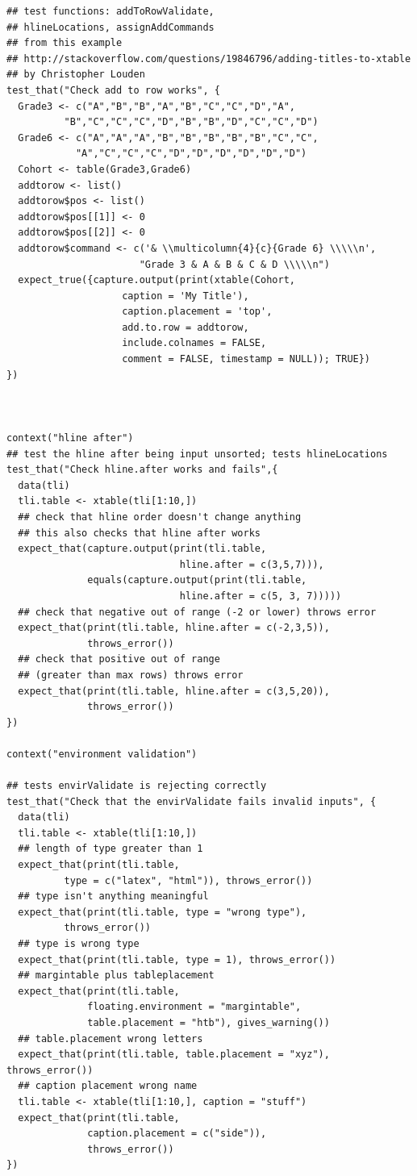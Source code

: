 \documentclass{memoir}\usepackage[]{graphicx}\usepackage[]{color}
\begin{document}
\begin{lstlisting}
## test functions: addToRowValidate, 
## hlineLocations, assignAddCommands
## from this example
## http://stackoverflow.com/questions/19846796/adding-titles-to-xtable
## by Christopher Louden
test_that("Check add to row works", {
  Grade3 <- c("A","B","B","A","B","C","C","D","A",
          "B","C","C","C","D","B","B","D","C","C","D")
  Grade6 <- c("A","A","A","B","B","B","B","B","C","C",
            "A","C","C","C","D","D","D","D","D","D")
  Cohort <- table(Grade3,Grade6)
  addtorow <- list()
  addtorow$pos <- list()
  addtorow$pos[[1]] <- 0
  addtorow$pos[[2]] <- 0
  addtorow$command <- c('& \\multicolumn{4}{c}{Grade 6} \\\\\n', 
                       "Grade 3 & A & B & C & D \\\\\n")
  expect_true({capture.output(print(xtable(Cohort, 
                    caption = 'My Title'), 
                    caption.placement = 'top', 
                    add.to.row = addtorow, 
                    include.colnames = FALSE, 
                    comment = FALSE, timestamp = NULL)); TRUE})
})



context("hline after")
## test the hline after being input unsorted; tests hlineLocations
test_that("Check hline.after works and fails",{
  data(tli)
  tli.table <- xtable(tli[1:10,])
  ## check that hline order doesn't change anything
  ## this also checks that hline after works
  expect_that(capture.output(print(tli.table, 
                              hline.after = c(3,5,7))), 
              equals(capture.output(print(tli.table, 
                              hline.after = c(5, 3, 7)))))
  ## check that negative out of range (-2 or lower) throws error
  expect_that(print(tli.table, hline.after = c(-2,3,5)),
              throws_error())
  ## check that positive out of range 
  ## (greater than max rows) throws error
  expect_that(print(tli.table, hline.after = c(3,5,20)),
              throws_error())
})

context("environment validation")

## tests envirValidate is rejecting correctly
test_that("Check that the envirValidate fails invalid inputs", {
  data(tli)
  tli.table <- xtable(tli[1:10,])
  ## length of type greater than 1
  expect_that(print(tli.table, 
          type = c("latex", "html")), throws_error())
  ## type isn't anything meaningful
  expect_that(print(tli.table, type = "wrong type"), 
          throws_error())
  ## type is wrong type
  expect_that(print(tli.table, type = 1), throws_error())
  ## margintable plus tableplacement
  expect_that(print(tli.table, 
              floating.environment = "margintable", 
              table.placement = "htb"), gives_warning())
  ## table.placement wrong letters
  expect_that(print(tli.table, table.placement = "xyz"), throws_error())
  ## caption placement wrong name
  tli.table <- xtable(tli[1:10,], caption = "stuff")
  expect_that(print(tli.table, 
              caption.placement = c("side")), 
              throws_error())
})


\end{lstlisting}
\end{document}
